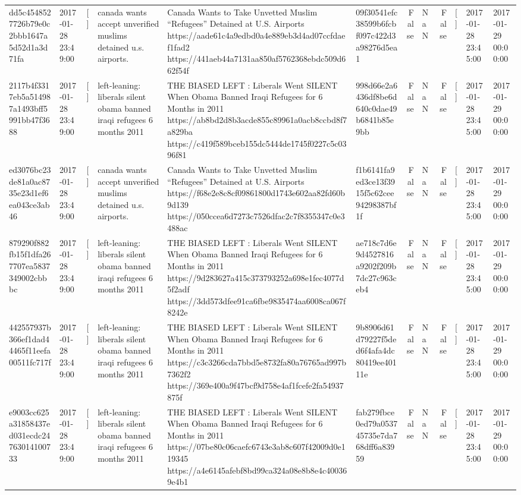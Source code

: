 \begin{tabular}{llllllrlrlll}
dd5c4548527726b79e0c2bbb1647a5d52d1a3d71fa & 2017-01-28 23:49:00 & [] & canada wants accept unverified muslims detained u.s. airports. & Canada Wants to Take Unvetted Muslim “Refugees” Detained at U.S. Airports https://aade61c4a9edbd0a4e889eb3d4ad07ccfdaef1fad2 https://441aeb44a7131aa850af5762368ebdc509d662f54f & 09f30541efc38599b6fcbf097c422d3a98276d5ea1 & False & NaN & False & [] & 2017-01-28 23:45:00 & 2017-01-29 00:00:00 \\
2117b4f3317eb5a514987a1493bff5991bb47f3688 & 2017-01-28 23:49:00 & [] & left-leaning: liberals silent obama banned iraqi refugees 6 months 2011 & THE BIASED LEFT : Liberals Went SILENT When Obama Banned Iraqi Refugees for 6 Months in 2011 https://ab8bd2d8b3acde855c89961a0acb8ccbd8f7a829ba https://c419f589bceb155dc5444de1745f0227c5c0396f81 & 998d66e2a6436df8be6d640c0dae49b6841b85e9bb & False & NaN & False & [] & 2017-01-28 23:45:00 & 2017-01-29 00:00:00 \\
ed3076bc23de81a0ac8735e23d1ef6ea043ce3ab46 & 2017-01-28 23:49:00 & [] & canada wants accept unverified muslims detained u.s. airports. & Canada Wants to Take Unvetted Muslim “Refugees” Detained at U.S. Airports https://f68e2e8c8cf09861800d1743e602aa82fd60b9d139 https://050ccea6d7273c7526dfac2c7f8355347c0e3488ac & f1b6141fa9ed3ce13f3915f5c62cee94298387bf1f & False & NaN & False & [] & 2017-01-28 23:45:00 & 2017-01-29 00:00:00 \\
879290f882fb15f1dfa267707ea5837349002cbbbc & 2017-01-28 23:49:00 & [] & left-leaning: liberals silent obama banned iraqi refugees 6 months 2011 & THE BIASED LEFT : Liberals Went SILENT When Obama Banned Iraqi Refugees for 6 Months in 2011 https://9d283627a415c373793252a698e1fec4077d5f2adf https://3dd573dfee91ca6fbe9835474aa6008ca067f8242e & ae718c7d6e9d4527816a9202f209b7dc27c963ceb4 & False & NaN & False & [] & 2017-01-28 23:45:00 & 2017-01-29 00:00:00 \\
442557937b366ef1dad44465f11eefa00511fc717f & 2017-01-28 23:49:00 & [] & left-leaning: liberals silent obama banned iraqi refugees 6 months 2011 & THE BIASED LEFT : Liberals Went SILENT When Obama Banned Iraqi Refugees for 6 Months in 2011 https://c3c3266cda7bbd5e8732fa80a76765ad997b7362f2 https://369e400a9f47bcf9d758e4af1fcefe2fa54937875f & 9b8906d61d79227f5ded6f4afa4dc80419ee40111e & False & NaN & False & [] & 2017-01-28 23:45:00 & 2017-01-29 00:00:00 \\
e9003cc625a31858437ed031ecdc24763014100733 & 2017-01-28 23:49:00 & [] & left-leaning: liberals silent obama banned iraqi refugees 6 months 2011 & THE BIASED LEFT : Liberals Went SILENT When Obama Banned Iraqi Refugees for 6 Months in 2011 https://07be80c06caefc6743e3ab8c607f42009d0e119345 https://a4e6145afebf8bd99ca324a08e8b8e4c400369e4b1 & fab279fbce0ed79a053745735e7da768dff6a83959 & False & NaN & False & [] & 2017-01-28 23:45:00 & 2017-01-29 00:00:00 \\

\end{tabular}
